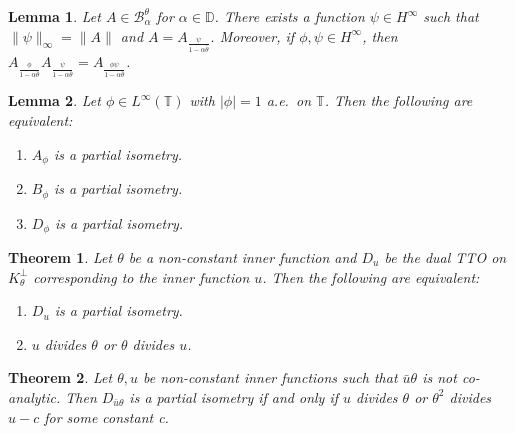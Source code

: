 \documentclass[10pt,a4paper]{amsart}
\newtheorem{lem}{Lemma}
\newtheorem{thm}{Theorem}
\newcommand{\D}{\mathbb{D}}
\newcommand{\T}{\mathbb{T}}
\begin{document}
\begin{lem}\label{typealphachar}
Let $A \in \mathscr{B}_{\alpha}^\theta$ for $\alpha \in \D$. There exists a function $ \psi \in H^\infty$ such that $\|\psi\|_\infty=\|A\|$ and $A=A_{\frac{\psi}{1-\alpha \bar{\theta}}}$. Moreover, if $\phi, \psi \in H^\infty$, then $A_{\frac{\phi}{1-\alpha \bar{\theta}}}A_{\frac{\psi}{1-\alpha \bar{\theta}}}=A_{\frac{\phi\psi}{1-\alpha \bar{\theta}}}$.
\end{lem}

\begin{lem}\label{Lem:A B and D partial isometry equivalences}
Let $\phi\in L^{\infty}(\T)$ with $|\phi|=1$ a.e.\ on $\T$. Then the following are equivalent:
		\begin{enumerate}
			\item $A_{\phi}$ is a partial isometry.
			\item $B_{\phi}$ is a partial isometry.
			\item $D_{\phi}$ is a partial isometry.
		\end{enumerate}
\end{lem}

\begin{thm}\label{Thm:Du partial isometry characterization}
Let $\theta$ be a non-constant inner function and $D_u$ be the dual TTO on $K_{\theta}^{\perp}$ corresponding to the inner function $u$. Then the following are equivalent:
\begin{enumerate}
\item $D_u$ is a partial isometry.
\item $u$ divides $\theta$ or $\theta$ divides $u$.
\end{enumerate}
\end{thm}

\begin{thm}
Let $\theta, u$ be non-constant inner functions such that $\bar{u}\theta$ is not co-analytic. Then $D_{\bar{u} \theta}$ is a partial isometry if and only if $u$ divides $\theta$ or $\theta^2$ divides $u-c$ for some constant c. 
\end{thm}
\end{document}
